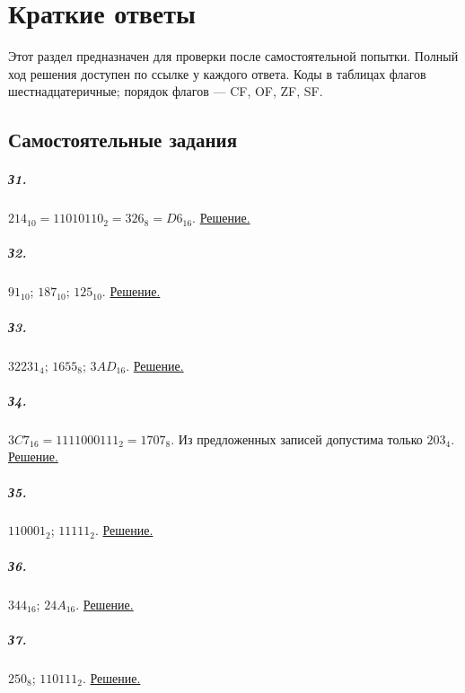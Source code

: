 \chapter{Краткие ответы}
Этот раздел предназначен для проверки после самостоятельной попытки. Полный ход решения доступен по ссылке у каждого ответа. Коды в таблицах флагов шестнадцатеричные; порядок флагов --- CF, OF, ZF, SF.

\section{Самостоятельные задания}
\paragraph*{З1.}\label{ans:z1}
$214_{10}=11010110_2=326_8=D6_{16}$.
\hyperref[sol:z1]{Решение.}

\paragraph*{З2.}\label{ans:z2}
$91_{10}$; $187_{10}$; $125_{10}$.
\hyperref[sol:z2]{Решение.}

\paragraph*{З3.}\label{ans:z3}
$32231_4$; $1655_8$; $3AD_{16}$.
\hyperref[sol:z3]{Решение.}

\paragraph*{З4.}\label{ans:z4}
$3C7_{16}=1111000111_2=1707_8$. Из предложенных записей допустима только $203_4$.
\hyperref[sol:z4]{Решение.}

\paragraph*{З5.}\label{ans:z5}
$110001_2$; $11111_2$.
\hyperref[sol:z5]{Решение.}

\paragraph*{З6.}\label{ans:z6}
$344_{16}$; $24A_{16}$.
\hyperref[sol:z6]{Решение.}

\paragraph*{З7.}\label{ans:z7}
$250_8$; $110111_2$.
\hyperref[sol:z7]{Решение.}


